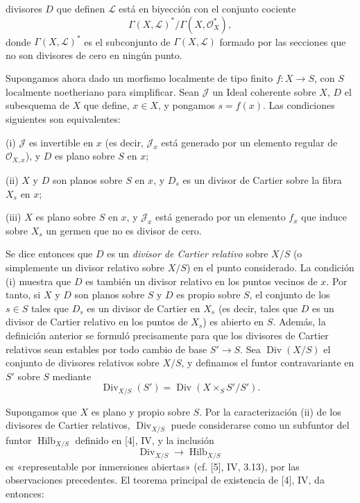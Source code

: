 \documentclass[11pt,twoside,openany]{book}
\numberwithin{equation}{section}
\newcommand{\src}[1]{%
  \phantomsection\hypertarget{src:#1}{}%
  \marginpar{\raggedleft\footnotesize\sffamily #1}%
}
\theoremstyle{plain}
\theoremstyle{definition}
\theoremstyle{remark}
\newcommand{\FgaUnitKey}{frontmatter}
\renewcommand{\src}[1]{%
  \phantomsection\hypertarget{src:\FgaUnitKey:#1}{}%
  \marginpar{\raggedleft\footnotesize\sffamily #1}%
}
\theoremstyle{plain}
\theoremstyle{definition}
\theoremstyle{remark}
\begin{document}
\src{151}
divisores $D$ que definen $\mathcal L$ está en biyección con el conjunto
cociente
\[
\Gamma(X,\mathcal L)^*/\Gamma(X,\mathcal O_X^*),
\]
donde $\Gamma(X,\mathcal L)^*$ es el subconjunto de
$\Gamma(X,\mathcal L)$ formado por las secciones que no son divisores de cero
en ningún punto.

Supongamos ahora dado un morfismo localmente de tipo finito
$f:X\longrightarrow S$, con $S$ localmente noetheriano para simplificar. Sean
$\mathcal J$ un Ideal coherente sobre $X$, $D$ el subesquema de $X$ que define,
$x\in X$, y pongamos $s=f(x)$. Las condiciones siguientes son equivalentes:

\noindent (i) $\mathcal J$ es invertible en $x$ (es decir, $\mathcal J_x$ está
generado por un elemento regular de $\mathcal O_{X,x}$), y $D$ es plano sobre
$S$ en $x$;

\noindent (ii) $X$ y $D$ son planos sobre $S$ en $x$, y $D_s$ es un divisor de
Cartier sobre la fibra $X_s$ en $x$;

\noindent (iii) $X$ es plano sobre $S$ en $x$, y $\mathcal J_x$ está generado
por un elemento $f_x$ que induce sobre $X_s$ un germen que no es divisor de
cero.

Se dice entonces que $D$ es un \emph{divisor de Cartier relativo} sobre $X/S$
(o simplemente un divisor relativo sobre $X/S$) en el punto considerado. La
condición (i) muestra que $D$ es también un divisor relativo en los puntos
vecinos de $x$. Por tanto, si $X$ y $D$ son planos sobre $S$ y $D$ es propio
sobre $S$, el conjunto de los $s\in S$ tales que $D_s$ es un divisor de Cartier
en $X_s$ (es decir, tales que $D$ es un divisor de Cartier relativo en los
puntos de $X_s$) es abierto en $S$. Además, la definición anterior se formuló
precisamente para que los divisores de Cartier relativos sean estables por todo
cambio de base $S'\longrightarrow S$. Sea $\operatorname{Div}(X/S)$ el
conjunto de divisores relativos sobre $X/S$, y definamos el funtor
contravariante en $S'$ sobre $S$ mediante
\[
\operatorname{Div}_{X/S}(S')=
\operatorname{Div}(X\times_SS'/S').
\]

Supongamos que $X$ es plano y propio sobre $S$. Por la caracterización (ii) de
los divisores de Cartier relativos, $\operatorname{Div}_{X/S}$ puede
considerarse como un subfuntor del funtor $\operatorname{Hilb}_{X/S}$ definido
en [4], IV, y la inclusión
\[
\operatorname{Div}_{X/S}\longrightarrow\operatorname{Hilb}_{X/S}
\]
es «representable por inmersiones abiertas» (cf. [5], IV, 3.13), por las
observaciones precedentes. El teorema principal de existencia de [4], IV, da
entonces:
\end{document}
